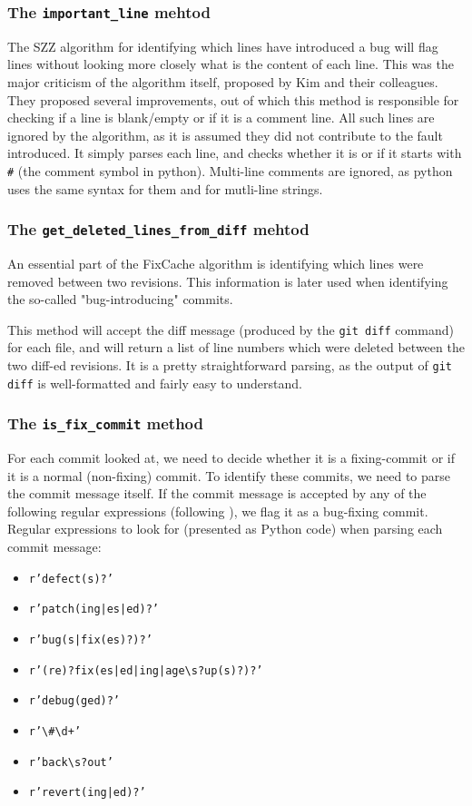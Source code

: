 \documentclass[12pt,twoside,notitlepage]{report}
\newcommand{\fxch}{FixCache }
\begin{document}
\subsubsection*{The \texttt{important\_line} mehtod}
The SZZ\cite{SZZ} algorithm for identifying which lines have introduced a bug will flag lines without looking more closely what is the content of each line. This was the major criticism of the algorithm itself, proposed by Kim and their colleagues\cite{KimZim}. They proposed several improvements, out of which this method is responsible for checking if a line is blank/empty or if it is a comment line. All such lines are ignored by the algorithm, as it is assumed they did not contribute to the fault introduced. It simply parses each line, and checks whether it is or if it starts with \texttt{\#} (the comment symbol in python). Multi-line comments are ignored, as python uses the same syntax for them and for mutli-line strings.
\subsubsection*{The \texttt{get\_deleted\_lines\_from\_diff} mehtod}
An essential part of the \fxch algorithm is identifying which lines were removed between two revisions. This information is later used when identifying the so-called "bug-introducing" commits.

This method will accept the diff message (produced by the \texttt{git diff} command) for each file, and will return a list of line numbers which were deleted between the two diff-ed revisions. It is a pretty straightforward parsing, as the output of \texttt{git diff} is well-formatted and fairly easy to understand.
\subsubsection*{The \texttt{is\_fix\_commit} method}
For each commit looked at, we need to decide whether it is a fixing-commit or if it is a normal (non-fixing) commit. To identify these commits, we need to parse the commit message itself. If the commit message is accepted by any of the following regular expressions (following \cite{Sadowski}), we flag it as a bug-fixing commit. Regular expressions to look for (presented as Python code) when parsing each commit message:
\begin{itemize}
\item \texttt{r'defect(s)?'}
\item \texttt{r'patch(ing|es|ed)?'}
\item \texttt{r'bug(s|fix(es)?)?'}
\item \texttt{r'(re)?fix(es|ed|ing|age\textbackslash s?up(s)?)?'}
\item \texttt{r'debug(ged)?'}
\item \texttt{r'\textbackslash\#\textbackslash d+'}
\item \texttt{r'back\textbackslash s?out'}
\item \texttt{r'revert(ing|ed)?'}
\end{itemize}
\end{document}
